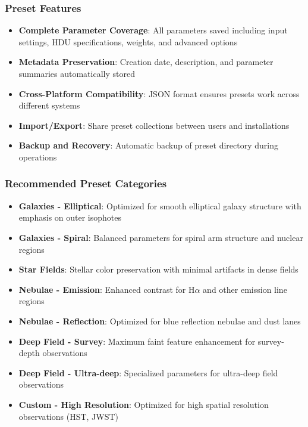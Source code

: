 \documentclass[11pt,a4paper]{article}
\begin{document}
\subsubsection{Preset Features}

\begin{itemize}[leftmargin=*]
\item \textbf{Complete Parameter Coverage}: All parameters saved including
input settings, HDU specifications, weights, and advanced options
\item \textbf{Metadata Preservation}: Creation date, description, and
parameter summaries automatically stored
\item \textbf{Cross-Platform Compatibility}: JSON format ensures presets
work across different systems
\item \textbf{Import/Export}: Share preset collections between users and
installations
\item \textbf{Backup and Recovery}: Automatic backup of preset directory
during operations
\end{itemize}

\subsubsection{Recommended Preset Categories}

\begin{itemize}[leftmargin=*]
\item \textbf{Galaxies - Elliptical}: Optimized for smooth elliptical
galaxy structure with emphasis on outer isophotes
\item \textbf{Galaxies - Spiral}: Balanced parameters for spiral arm
structure and nuclear regions
\item \textbf{Star Fields}: Stellar color preservation with minimal
artifacts in dense fields
\item \textbf{Nebulae - Emission}: Enhanced contrast for H$\alpha$ and
other emission line regions
\item \textbf{Nebulae - Reflection}: Optimized for blue reflection nebulae
and dust lanes
\item \textbf{Deep Field - Survey}: Maximum faint feature enhancement for
survey-depth observations
\item \textbf{Deep Field - Ultra-deep}: Specialized parameters for
ultra-deep field observations
\item \textbf{Custom - High Resolution}: Optimized for high spatial
resolution observations (HST, JWST)
\end{itemize}
\end{document}

